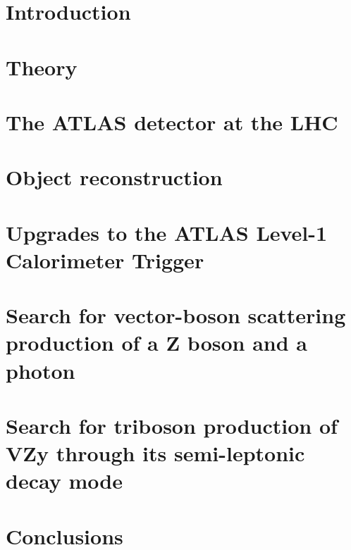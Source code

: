 \newcommand\relpath[1]{#1}
\newcommand\inputchapter[1]{}
\newcommand\resource[1]{#1}
\chapter{Introduction}
\inputchapter{introduction}

\chapter{Theory}
\inputchapter{theory}

\chapter{The ATLAS detector at the \acl{LHC}}
\inputchapter{detector}

\chapter{Object reconstruction}
\inputchapter{object-reco}

\chapter{Upgrades to the ATLAS Level-1 Calorimeter Trigger}
\inputchapter{l1calo}

\chapter{Search for vector-boson scattering production of a Z boson and a photon}
\inputchapter{vbs}

\chapter{Search for triboson production of VZy through its semi-leptonic decay mode}
\inputchapter{vzy}

\chapter{Conclusions}
\inputchapter{conclusion}
